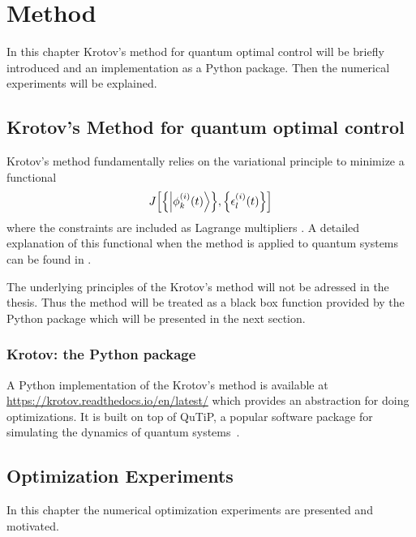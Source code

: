 \documentclass[main.tex]{subfiles}
\begin{document}
\chapter{Method}
In this chapter Krotov's method for quantum optimal control will be briefly introduced and an implementation as a Python package.
Then the numerical experiments will be explained.

\section{Krotov's Method for quantum optimal control}
Krotov's method fundamentally relies on the variational principle to minimize a functional \[ J\qty[\qty{\ket{\phi^{(i)}_k(t)}},\qty{\epsilon_l^{(i)}(t)}] \] where the constraints are included as Lagrange multipliers \cite{goerz_krotov:_2019}.
A detailed explanation of this functional when the method is applied to quantum systems can be found in \cite{reich_monotonically_2012}.

The underlying principles of the Krotov's method will not be adressed in the thesis.
Thus the method will be treated as a black box function provided by the Python package which will be presented in the next section.

\subsection{Krotov: the Python package}
A Python implementation of the Krotov's method is available at \url{https://krotov.readthedocs.io/en/latest/} which provides
an abstraction for doing optimizations.
It is built on top of QuTiP, a popular software package for simulating the dynamics of quantum systems~\cite{}.

\section{Optimization Experiments}
In this chapter the numerical optimization experiments are presented and motivated.
\end{document}
